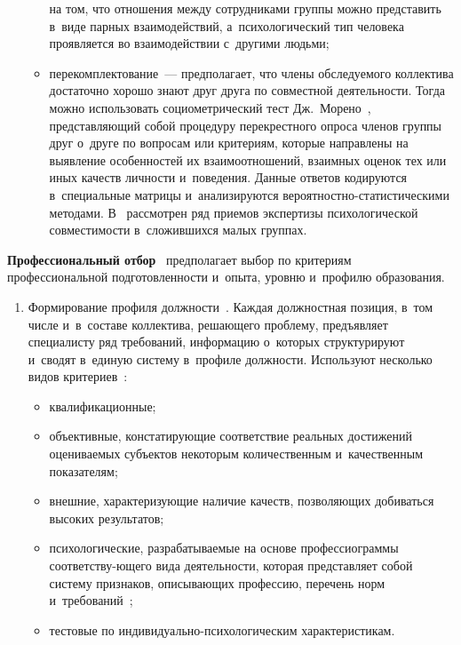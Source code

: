 \begin{multicols}{2}
\begin{enumerate}[1.]
\begin{itemize}
на том, что отношения между сотрудниками группы можно пред\-ста\-вить в~виде 
парных взаимодействий, а~психологический тип человека проявляется во 
взаимодействии с~другими людьми;\\ [-14pt]
\item перекомплектование~--- предполагает, что члены об\-сле\-ду\-емо\-го 
коллектива достаточно хорошо знают друг друга по со\-вмест\-ной дея\-тель\-ности. 
Тогда мож\-но использовать со\-цио\-мет\-ри\-че\-ский тест Дж.~Морено~\cite{21-r}, 
пред\-став\-ля\-ющий собой процедуру пе\-ре\-крест\-но\-го опроса членов группы друг 
о~друге по вопросам или критериям, которые на\-прав\-ле\-ны на выявление 
особенностей их взаимоотношений, взаимных оценок тех или иных качеств 
лич\-ности и~поведения. Данные ответов кодируются в~специальные мат\-ри\-цы 
и~анализируются ве\-ро\-ят\-ност\-но-ста\-ти\-сти\-че\-ски\-ми методами. 
В~\cite{22-r, 23-r, 24-r} рас\-смот\-рен ряд приемов экспертизы психологической 
со\-вмес\-ти\-мости в~сло\-жив\-ших\-ся малых группах.\\[-14pt]
\end{itemize}
\end{enumerate}
  
  \textbf{Профессиональный отбор}~\cite{7-r} предполагает выбор по 
критериям профессиональной под\-го\-тов\-лен\-ности и~опыта, уровню и~профилю 
образования. 
  \begin{enumerate}[1.]
\item Формирование профиля должности~\cite{6-r}. Каждая должностная 
позиция, в~том чис\-ле и~в~со\-ста\-ве коллектива, ре\-ша\-юще\-го проб\-ле\-му, 
предъявляет специалисту ряд требований, информацию о~которых 
структурируют и~сводят в~единую сис\-те\-му в~профиле долж\-ности. Используют 
несколько видов критериев~\cite{15-r}: 
\begin{itemize}
\item квалификационные; 
\item объективные, кон\-ста\-ти\-ру\-ющие соответствие реальных достижений 
оце\-ни\-ва\-емых субъектов некоторым количественным и~качественным 
показателям; 
\item внеш\-ние, ха\-рак\-те\-ри\-зу\-ющие наличие качеств, поз\-во\-ля\-ющих 
добиваться высоких результатов; 
\item психологические, раз\-ра\-ба\-ты\-ва\-емые на 
осно\-ве профессиограммы со\-от\-вет\-ст\-ву-\linebreak юще\-го вида дея\-тель\-ности, которая 
пред\-став\-ля\-ет собой сис\-те\-му при\-зна\-ков, опи\-сы\-ва\-ющих профессию, перечень 
норм и~\mbox{требований}~\cite{7-r}; 
\item тес\-то\-вые по ин\-ди\-ви\-ду\-аль\-но-пси\-хо\-ло\-ги\-че\-ским 
характеристикам.
\end{itemize}


\end{enumerate}
\end{multicols}
